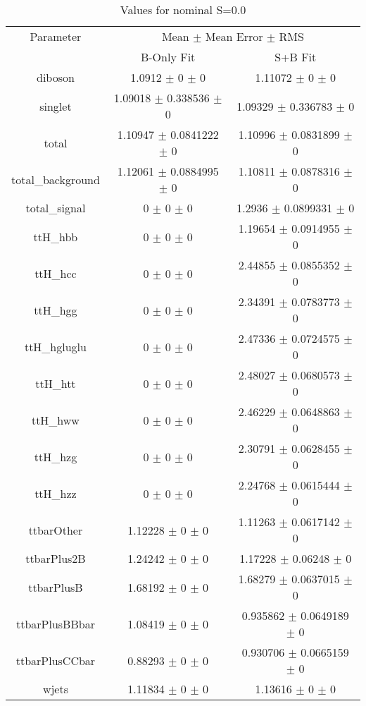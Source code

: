 \begin{table}
\centering
\caption{Values for nominal S=0.0}
\begin{tabular}{ccc}
\toprule
Parameter & \multicolumn{2}{c}{Mean $\pm$ Mean Error $\pm$ RMS}\\
 & B-Only Fit & S+B Fit\\
\midrule
diboson & \num{1.0912} $\pm$ \num{0} $\pm$ \num{0} & \num{1.11072} $\pm$ \num{0} $\pm$ \num{0}\\
singlet & \num{1.09018} $\pm$ \num{0.338536} $\pm$ \num{0} & \num{1.09329} $\pm$ \num{0.336783} $\pm$ \num{0}\\
total & \num{1.10947} $\pm$ \num{0.0841222} $\pm$ \num{0} & \num{1.10996} $\pm$ \num{0.0831899} $\pm$ \num{0}\\
total\_background & \num{1.12061} $\pm$ \num{0.0884995} $\pm$ \num{0} & \num{1.10811} $\pm$ \num{0.0878316} $\pm$ \num{0}\\
total\_signal & \num{0} $\pm$ \num{0} $\pm$ \num{0} & \num{1.2936} $\pm$ \num{0.0899331} $\pm$ \num{0}\\
ttH\_hbb & \num{0} $\pm$ \num{0} $\pm$ \num{0} & \num{1.19654} $\pm$ \num{0.0914955} $\pm$ \num{0}\\
ttH\_hcc & \num{0} $\pm$ \num{0} $\pm$ \num{0} & \num{2.44855} $\pm$ \num{0.0855352} $\pm$ \num{0}\\
ttH\_hgg & \num{0} $\pm$ \num{0} $\pm$ \num{0} & \num{2.34391} $\pm$ \num{0.0783773} $\pm$ \num{0}\\
ttH\_hgluglu & \num{0} $\pm$ \num{0} $\pm$ \num{0} & \num{2.47336} $\pm$ \num{0.0724575} $\pm$ \num{0}\\
ttH\_htt & \num{0} $\pm$ \num{0} $\pm$ \num{0} & \num{2.48027} $\pm$ \num{0.0680573} $\pm$ \num{0}\\
ttH\_hww & \num{0} $\pm$ \num{0} $\pm$ \num{0} & \num{2.46229} $\pm$ \num{0.0648863} $\pm$ \num{0}\\
ttH\_hzg & \num{0} $\pm$ \num{0} $\pm$ \num{0} & \num{2.30791} $\pm$ \num{0.0628455} $\pm$ \num{0}\\
ttH\_hzz & \num{0} $\pm$ \num{0} $\pm$ \num{0} & \num{2.24768} $\pm$ \num{0.0615444} $\pm$ \num{0}\\
ttbarOther & \num{1.12228} $\pm$ \num{0} $\pm$ \num{0} & \num{1.11263} $\pm$ \num{0.0617142} $\pm$ \num{0}\\
ttbarPlus2B & \num{1.24242} $\pm$ \num{0} $\pm$ \num{0} & \num{1.17228} $\pm$ \num{0.06248} $\pm$ \num{0}\\
ttbarPlusB & \num{1.68192} $\pm$ \num{0} $\pm$ \num{0} & \num{1.68279} $\pm$ \num{0.0637015} $\pm$ \num{0}\\
ttbarPlusBBbar & \num{1.08419} $\pm$ \num{0} $\pm$ \num{0} & \num{0.935862} $\pm$ \num{0.0649189} $\pm$ \num{0}\\
ttbarPlusCCbar & \num{0.88293} $\pm$ \num{0} $\pm$ \num{0} & \num{0.930706} $\pm$ \num{0.0665159} $\pm$ \num{0}\\
wjets & \num{1.11834} $\pm$ \num{0} $\pm$ \num{0} & \num{1.13616} $\pm$ \num{0} $\pm$ \num{0}\\
\bottomrule
\end{tabular}
\end{table}